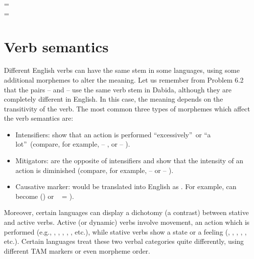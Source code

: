 \begin{refsection}
\begin{mysolution}
\begin{solutions}
    \item {}
    \item {} =  \\  = 
\end{solutions}
\end{mysolution}

\section{Verb semantics}

Different English verbs can have the same stem in some languages, using some additional morphemes to alter the meaning. Let us remember from Problem 6.2 that the pairs  –  and  –  use the same verb stem in Dabida, although they are completely different in English. In this case, the meaning depends on the transitivity of the verb. The most common three types of morphemes which affect the verb semantics are:

\begin{itemize}
\item Intensifiers: show that an action is performed “excessively”\ or “a lot”\ (compare, for example,  – , or  – ).
\item Mitigators: are the opposite of intensifiers and show that the intensity of an action is diminished (compare, for example,  –  or  – ).
\item Causative marker: would be translated into English as . For example,  can become  () or  \rightarrow\  = ).
\end{itemize}

Moreover, certain languages can display a dichotomy (a contrast) between stative and active verbs. Active (or dynamic) verbs involve movement, an action which is performed (e.g., , , , , , etc.), while stative verbs show a state or a feeling (, , , , , etc.). Certain languages treat these two verbal categories quite differently, using different TAM markers or even morpheme order.


\end{refsection}
